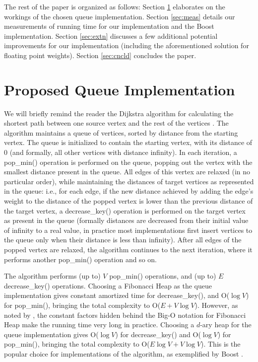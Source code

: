 \documentclass[conference,10pt,twocolumn]{IEEEtran}
\begin{document}
The rest of the paper is organized as follows: Section \ref{sec:Qimpl} elaborates on the workings of the chosen queue implementation. Section \ref{sec:meas} details our measurements of running time for our implementation and the Boost implementation. Section \ref{sec:extn} discusses a few additional potential improvements for our implementation (including the aforementioned solution for floating point weights). Section \ref{sec:cncld} concludes the paper.

\section{Proposed Queue Implementation}  \label{sec:Qimpl}

We will briefly remind the reader the Dijkstra algorithm for calculating the shortest path between one source vertex and the rest of the vertices \cite{Cormen90}.
The algorithm maintains a queue of vertices, sorted by distance from the starting vertex. The queue is initialized to contain the starting vertex, with its distance of 0 (and formally, all other vertices with distance infinity). In each iteration, a pop\_min() operation is performed on the queue, popping out the vertex with the smallest distance present in the queue. All edges of this vertex are relaxed (in no particular order), while maintaining the distances of target vertices as represented in the queue: i.e., for each edge, if the new distance achieved by adding the edge's weight to the distance of the popped vertex is lower than the previous distance of the target vertex, a decrease\_key() operation is performed on the target vertex as present in the queue (formally distances are decreased from their initial value of infinity to a real value, in practice most implementations first insert vertices to the queue only when their distance is less than infinity). After all edges of the popped vertex are relaxed, the algorithm continues to the next iteration, where it performs another pop\_min() operation and so on.

The algorithm performs (up to) $V$ pop\_min() operations, and (up to) $E$ decrease\_key() operations. Choosing a Fibonacci Heap as the queue implementation gives constant amortized time for decrease\_key(), and O($\log V$) for pop\_min(), bringing the total complexity to O($E+V\log V$). However, as noted by \cite[Ch.\ 21]{Cormen90}, the constant factors hidden behind the Big-O notation for Fibonacci Heap make the running time very long in practice. Choosing a $d$-ary heap for the queue implementation gives O($\log V$) for decrease\_key() and O($\log V$) for pop\_min(), bringing the total complexity to O($E\log V + V\log V$). This is the popular choice for implementations of the algorithm, as exemplified by Boost \cite{Boost}.
\end{document}
